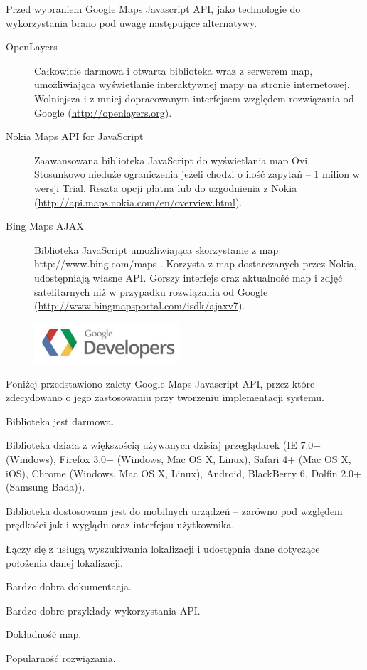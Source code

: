 Przed wybraniem Google Maps Javascript API, jako technologie do wykorzystania brano pod uwagę następujące alternatywy.
\begin{description}
    \item[OpenLayers] Całkowicie darmowa i otwarta biblioteka wraz z serwerem map, umożliwiająca wyświetlanie interaktywnej mapy na stronie internetowej. Wolniejsza i z mniej dopracowanym interfejsem względem rozwiązania od Google (\url{http://openlayers.org}).
    \item[Nokia Maps API for JavaScript] Zaawansowana biblioteka JavaScript do wyświetlania map Ovi. Stosunkowo nieduże ograniczenia jeżeli chodzi o ilość zapytań -- 1 milion w wersji Trial. Reszta opcji płatna lub do uzgodnienia z Nokia (\url{http://api.maps.nokia.com/en/overview.html}).
    \item[Bing Maps AJAX] Biblioteka JavaScript umożliwiająca skorzystanie z map http://www.bing.com/maps . Korzysta z map dostarczanych przez Nokia, udostępniają własne API. Gorszy interfejs oraz aktualność map i zdjęć satelitarnych niż w przypadku rozwiązania od Google (\url{http://www.bingmapsportal.com/isdk/ajaxv7}).
\end{description}

\begin{figure}
  \begin{center}
    \includegraphics[width=0.48\textwidth]{img/logos/google-maps-api.jpg}
  \end{center}
\end{figure}


Poniżej przedstawiono zalety Google Maps Javascript API, przez które zdecydowano o jego zastosowaniu przy tworzeniu implementacji systemu.
\begin{packed_item}
    \item{Biblioteka jest darmowa.}
    \item{Biblioteka działa z większością używanych dzisiaj przeglądarek (IE 7.0+ (Windows), Firefox 3.0+ (Windows, Mac OS X, Linux), Safari 4+ (Mac OS X, iOS), Chrome (Windows, Mac OS X, Linux), Android, BlackBerry 6, Dolfin 2.0+ (Samsung Bada)).}
    \item{Biblioteka dostosowana jest do mobilnych urządzeń -- zarówno pod względem prędkości jak i wyglądu oraz interfejsu użytkownika.}
    \item{Łączy się z usługą wyszukiwania lokalizacji i udostępnia dane dotyczące położenia danej lokalizacji.}
    \item{Bardzo dobra dokumentacja.}
    \item{Bardzo dobre przykłady wykorzystania API.}
    \item{Dokładność map.}
    \item{Popularność rozwiązania.}
\end{packed_item}

